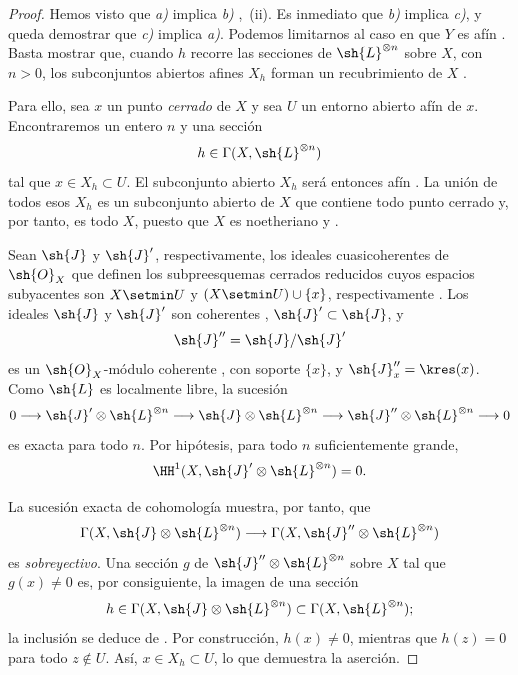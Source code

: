 \documentclass[oneside]{amsart}
\newcommand{\oldpage}[2][]{{\marginnote{\normalfont\textbf{#1}~|~#2}}\ignorespaces}
\begin{document}
\begin{proof}
Hemos visto que \emph{a)} implica \emph{b)} ,~(ii).
Es inmediato que \emph{b)} implica \emph{c)}, y queda demostrar
que \emph{c)} implica \emph{a)}.
Podemos limitarnos al caso en que $Y$ es afín .
Basta mostrar que, cuando $h$ recorre las secciones de
$\sh{L}^{\otimes n}$ sobre $X$, con $n>0$, los subconjuntos abiertos afines $X_h$
forman un recubrimiento de $X$ .

Para ello, sea $x$ un punto \emph{cerrado} de $X$ y sea $U$ un entorno
abierto afín de $x$.
Encontraremos un entero $n$ y una sección
\[
  h\in\Gamma(X,\sh{L}^{\otimes n})
\]
tal que $x\in X_h\subset U$.
El subconjunto abierto $X_h$ será entonces afín .
La unión de todos esos $X_h$ es un subconjunto abierto de $X$ que contiene todo
punto cerrado y, por tanto, es todo $X$, puesto que $X$ es noetheriano
 y .

Sean $\sh{J}$ y $\sh{J}'$, respectivamente, los ideales cuasicoherentes de
$\sh{O}_X$ que definen los subpreesquemas cerrados reducidos cuyos espacios
subyacentes son $X\setmin U$ y $(X\setmin U)\cup\{x\}$, respectivamente .
Los ideales $\sh{J}$ y $\sh{J}'$ son coherentes ,
$\sh{J}'\subset\sh{J}$, y
\[
  \sh{J}''=\sh{J}/\sh{J}'
\]
es un $\sh{O}_X$-módulo coherente , con soporte
$\{x\}$, y $\sh{J}''_x=\kres(x)$.
Como $\sh{L}$ es localmente libre, la sucesión
\[
  0\longrightarrow
  \sh{J}'\otimes\sh{L}^{\otimes n}
  \longrightarrow
  \sh{J}\otimes\sh{L}^{\otimes n}
  \longrightarrow
  \sh{J}''\otimes\sh{L}^{\otimes n}
  \longrightarrow0
\]
es exacta para todo $n$.
Por hipótesis, para todo $n$ suficientemente grande,
\[
  \HH^1(X,\sh{J}'\otimes\sh{L}^{\otimes n})=0.
\]

\oldpage[III]{112}

La sucesión exacta de cohomología muestra, por tanto, que
\[
  \Gamma(X,\sh{J}\otimes\sh{L}^{\otimes n})
  \longrightarrow
  \Gamma(X,\sh{J}''\otimes\sh{L}^{\otimes n})
\]
es \emph{sobreyectivo}.
Una sección $g$ de $\sh{J}''\otimes\sh{L}^{\otimes n}$ sobre $X$ tal que
$g(x)\neq0$ es, por consiguiente, la imagen de una sección
\[
  h\in\Gamma(X,\sh{J}\otimes\sh{L}^{\otimes n})
  \subset\Gamma(X,\sh{L}^{\otimes n});
\]
la inclusión se deduce de .
Por construcción, $h(x)\neq0$, mientras que $h(z)=0$ para todo $z\notin U$.
Así, $x\in X_h\subset U$, lo que demuestra la aserción.
\end{proof}
\end{document}
